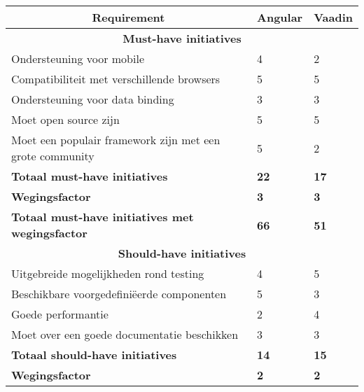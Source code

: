 \begin{table}[H]
	\begin{tabular}{|l|l|l|}
		\hline
		\multicolumn{1}{|c|}{\textbf{Requirement}}                & \textbf{Angular} & \textbf{Vaadin} \\ \hline
		\multicolumn{3}{|c|}{\textbf{Must-have initiatives}}                                           \\ \hline
		Ondersteuning voor mobile                                 & 4                & 2               \\ \hline
		Compatibiliteit met verschillende browsers                & 5                & 5               \\ \hline
		Ondersteuning voor data binding                           & 3                & 3               \\ \hline
		Moet open source zijn                                     & 5                & 5               \\ \hline
		Moet een populair framework zijn met een grote community  & 5                & 2               \\ \hline
		\textbf{Totaal must-have initiatives}                     & \textbf{22}      & \textbf{17}     \\ \hline
		\textbf{Wegingsfactor}                                    & \textbf{3}       & \textbf{3}      \\ \hline
		\textbf{Totaal must-have initiatives met wegingsfactor}   & \textbf{66}      & \textbf{51}     \\ \hline
		\multicolumn{3}{|c|}{\textbf{Should-have initiatives}}                                         \\ \hline
		Uitgebreide mogelijkheden rond testing                    & 4                & 5               \\ \hline
		Beschikbare voorgedefiniëerde componenten                 & 5                & 3               \\ \hline
		Goede performantie                                        & 2                & 4               \\ \hline
		Moet over een goede documentatie beschikken               & 3                & 3               \\ \hline
		\textbf{Totaal should-have initiatives}                   & \textbf{14}      & \textbf{15}     \\ \hline
		\textbf{Wegingsfactor}                                    & \textbf{2}       & \textbf{2}      \\ \hline

\end{tabular}
\end{table}
